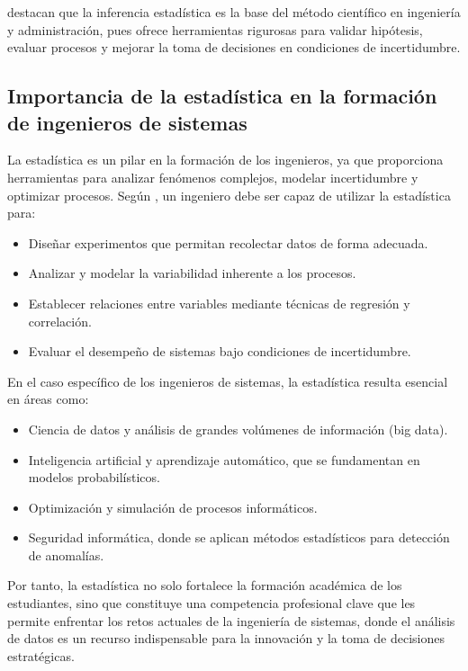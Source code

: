 \documentclass[letter,oneside,12pt,spanish]{report}
\begin{document}
\textcite{montgomery1996} destacan que la inferencia estadística es la base del método científico en ingeniería y administración, pues ofrece herramientas rigurosas para validar hipótesis, evaluar procesos y mejorar la toma de decisiones en condiciones de incertidumbre.

\subsection{Importancia de la estadística en la formación de ingenieros de sistemas}

La estadística es un pilar en la formación de los ingenieros, ya que proporciona herramientas para analizar fenómenos complejos, modelar incertidumbre y optimizar procesos. Según \textcite{montgomery1996}, un ingeniero debe ser capaz de utilizar la estadística para:

\begin{itemize}
	\item Diseñar experimentos que permitan recolectar datos de forma adecuada.
	\item Analizar y modelar la variabilidad inherente a los procesos.
	\item Establecer relaciones entre variables mediante técnicas de regresión y correlación.
	\item Evaluar el desempeño de sistemas bajo condiciones de incertidumbre.
\end{itemize}

En el caso específico de los ingenieros de sistemas, la estadística resulta esencial en áreas como:

\begin{itemize}
	\item Ciencia de datos y análisis de grandes volúmenes de información (big data).
	\item Inteligencia artificial y aprendizaje automático, que se fundamentan en modelos probabilísticos.
	\item Optimización y simulación de procesos informáticos.
	\item Seguridad informática, donde se aplican métodos estadísticos para detección de anomalías.
\end{itemize}

Por tanto, la estadística no solo fortalece la formación académica de los estudiantes, sino que constituye una competencia profesional clave que les permite enfrentar los retos actuales de la ingeniería de sistemas, donde el análisis de datos es un recurso indispensable para la innovación y la toma de decisiones estratégicas.
\end{document}
